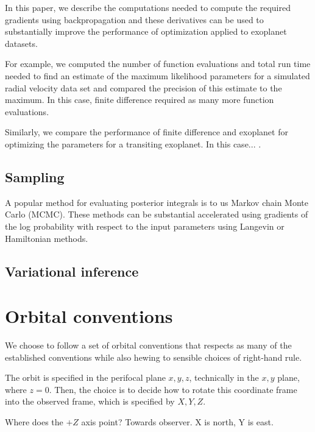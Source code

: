 \documentclass[modern]{aastex62}
\begin{document}
In this paper, we describe the computations needed to compute the required gradients using backpropagation and these derivatives can be used to substantially improve the performance of optimization applied to exoplanet datasets.


For example, we computed the number of function evaluations and total run time needed to find an estimate of the maximum likelihood parameters for a simulated radial velocity data set and compared the precision of this estimate to the  maximum.
In this case, finite difference required  as many more function evaluations.

Similarly, we compare the performance of finite difference and exoplanet for optimizing the parameters for a transiting exoplanet.
In this case... .

\subsection{Sampling}

A popular method for evaluating posterior integrals is to us Markov chain Monte Carlo (MCMC).
These methods can be substantial accelerated using gradients of the log probability with respect to the input parameters using Langevin or Hamiltonian methods.




\subsection{Variational inference}

\section{Orbital conventions}
We choose to follow a set of orbital conventions that respects as many of the established conventions while also hewing to sensible choices of right-hand rule.

The orbit is specified in the perifocal plane $x,y,z$, technically in the $x,y$ plane, where $z=0$. Then, the choice is to decide how to rotate this coordinate frame into the observed frame, which is specified by $X,Y,Z$.

Where does the $+Z$ axis point? Towards observer. X is north, Y is east.
\end{document}

